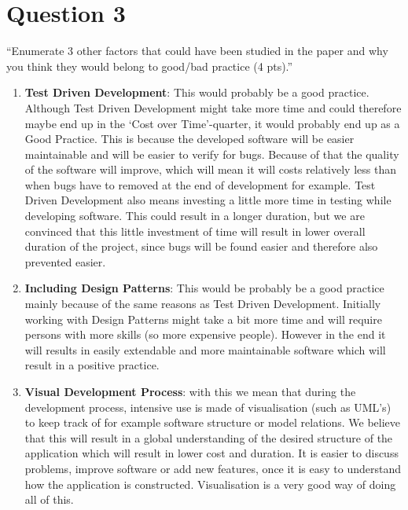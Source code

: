 \section{Question 3}

``Enumerate 3 other factors that could have been studied in the paper and why you think they would belong to good/bad practice (4 pts).'' \\

\begin{enumerate}
	\item \textbf{Test Driven Development}: This would probably be a good practice. Although Test Driven Development might take more time and could therefore maybe end up in the `Cost over Time'-quarter, it would probably end up as a Good Practice. This is because the developed software will be easier maintainable and will be easier to verify for bugs. Because of that the quality of the software will improve, which will mean it will costs relatively less than when bugs have to removed at the end of development for example. Test Driven Development also means investing a little more time in testing while developing software. This could result in a longer duration, but we are convinced that this little investment of time will result in lower overall duration of the project, since bugs will be found easier and therefore also prevented easier. 
	\item \textbf{Including Design Patterns}: This would be probably be a good practice mainly because of the same reasons as Test Driven Development. Initially working with Design Patterns might take a bit more time and will require persons with more skills (so more expensive people). However in the end it will results in easily extendable and more maintainable software which will result in a positive practice. 
	\item \textbf{Visual Development Process}: with this we mean that during the development process, intensive use is made of visualisation (such as UML's) to keep track of for example software structure or model relations. We believe that this will result in a global understanding of the desired structure of the application which will result in lower cost and duration. It is easier to discuss problems, improve software or add new features, once it is easy to understand how the application is constructed. Visualisation is a very good way of doing all of this. 
\end{enumerate}